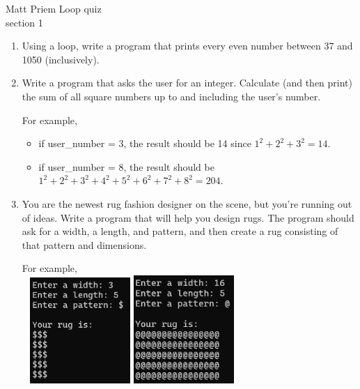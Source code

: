 \documentclass{article}
\begin{document}

Matt Priem \hfill Loop quiz\\
section 1\\
\begin{enumerate}
	\item 
		Using a loop, write a program that prints every even number 
		between 37 and 1050 (inclusively).


	\item 
		Write a program that asks the user for an integer.  Calculate (and then print) the 
		sum of all square numbers up to and including the user's number.

		For example, 
		\begin{itemize}
			\item if user\_number = 3, the result should be 14 since $1^2 + 2^2 + 3^2 = 14$.
			\item if user\_number = 8, the result should be $1^2+2^2+3^2+4^2+5^2+6^2+7^2+8^2=204$.
		\end{itemize}









	\item 
		You are the newest rug fashion designer on the scene, but you're running out of ideas. 
		Write a program that will help you design rugs.  The program should ask for a width, 
		a length, and pattern, and then create a rug consisting of that pattern and dimensions.

		For example, \\ \ \hfill
		\includegraphics[width = 1.5in]{./imgs/rug1.PNG} \hfill  
		\includegraphics[width = 1.5in]{./imgs/rug2.PNG} \hfill \


\end{enumerate}
\end{document}
